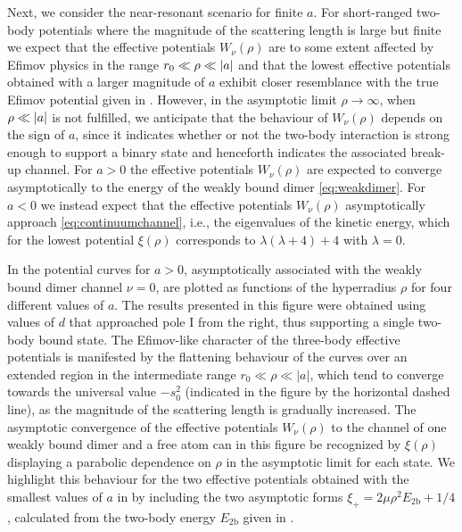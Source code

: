 Next, we consider the near-resonant scenario for finite $a$. For short-ranged two-body potentials where the magnitude of the scattering length is large but finite we expect that the effective potentials $W_{\nu}(\rho)$ are to some extent affected by Efimov physics in the range $r_0 \ll \rho \ll \lvert a\rvert$ and that the lowest effective potentials obtained with a larger magnitude of $a$ exhibit closer resemblance with the true Efimov potential given in . However, in the asymptotic limit $\rho \rightarrow \infty$, when $\rho \ll \lvert a\rvert$ is not fulfilled, we anticipate that the behaviour of $W_{\nu}(\rho)$ depends on the sign of $a$, since it indicates whether or not the two-body interaction is strong enough to support a binary state and henceforth indicates the associated break-up channel. For $a>0$ the effective potentials $W_{\nu}(\rho)$ are expected to converge asymptotically to the energy of the weakly bound dimer \eqref{eq:weakdimer}. For $a<0$ we instead expect that the effective potentials $W_{\nu}(\rho)$ asymptotically approach \eqref{eq:continuumchannel}, i.e., the eigenvalues of the kinetic energy, which for the lowest potential $\xi(\rho)$ corresponds to $\lambda(\lambda + 4) + 4$ with $\lambda = 0$.

In  the potential curves for $a>0$, asymptotically associated with the weakly bound dimer channel $\nu = 0$, are plotted as functions of the hyperradius $\rho$ for four different values of $a$. The results presented in this figure were obtained using values of $d$ that approached pole $\mathrm{I}$ from the right, thus supporting a single two-body bound state. The Efimov-like character of the three-body effective potentials is manifested by the flattening behaviour of the curves over an extended region in the intermediate range $r_0 \ll \rho \ll |a|$, which tend to converge towards the universal value $-s_0^2$ (indicated in the figure by the horizontal dashed line), as the magnitude of the scattering length is gradually increased. The asymptotic convergence of the effective potentials $W_{\nu}(\rho)$ to the channel of one weakly bound dimer and a free atom can in this figure be recognized by $\xi(\rho)$ displaying a parabolic dependence on $\rho$ in the asymptotic limit for each state. We highlight this behaviour for the two effective potentials obtained with the smallest values of $a$ in  by including the two asymptotic forms $\xi_+ = 2\mu \rho^2 E_{2\mathrm{b}} + 1/4$, calculated from the two-body energy $E_{2\mathrm{b}}$ given in .   

